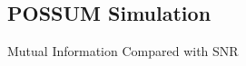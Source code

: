 \documentclass{beamer}
\begin{document}
\subsection{POSSUM Simulation}
\begin{frame}{Mutual Information Compared with SNR}
\begin{figure}
\centering
{}

\end{figure}
\end{frame}
\end{document}
